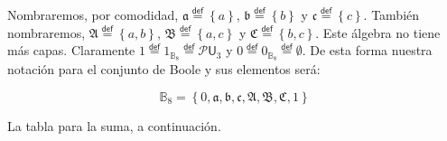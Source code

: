 \documentclass[final,12pt,a4paper,twoside,fleqn]{extbook}
\newcommand{\mathdef}{\ensuremath{\stackrel{\mathsf{def}}{{}={}}}}
\newcommand{\set}[1]{\ensuremath{\left\lbrace{#1}\right\rbrace}}
\newcommand{\setB}{\ensuremath{\mathbb{B}}}
\theoremstyle{definition}
\theoremstyle{remark}
\begin{document}
	Nombraremos, por comodidad, \( \mathfrak{a} \mathdef \set{a} \), \(
\mathfrak{b} \mathdef \set{b} \)  y  \( \mathfrak{c} \mathdef \set{c} \).
También nombraremos, \( \mathfrak{A} \mathdef \set{a,b} \), \( \mathfrak{B}
\mathdef \set{a,c} \) y \( \mathfrak{C} \mathdef \set{b,c} \). Este álgebra
no tiene más capas. Claramente \(\mathfrak{1} \mathdef 1_{\setB_{8}} \mathdef
\mathscr{P}\mathsf{U}_3 \) y \(\mathfrak{0} \mathdef 0_{\setB_{8}} \mathdef
\emptyset \). De esta forma nuestra notación para el conjunto de Boole y sus
elementos será:




\begin{equation}
\setB_{8} =
\set{
\mathfrak{0},
\mathfrak{a},\mathfrak{b},\mathfrak{c},
\mathfrak{A},\mathfrak{B},\mathfrak{C},
\mathfrak{1}
}
\end{equation}



	La tabla para la suma, a continuación.
\end{document}
